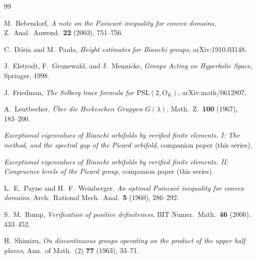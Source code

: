 \documentclass[11pt]{amsart}
\begin{document}
\begin{thebibliography}{99}

M.~Bebendorf,
\emph{A note on the Poincar\'e inequality for convex domains},
Z.\ Anal.\ Anwend.\ \textbf{22} (2003), 751--756.

C.~D\'oria and M.~Paula,
\emph{Height estimates for Bianchi groups},
arXiv:1910.03148.

J.~Elstrodt, F.~Grunewald, and J.~Mennicke,
\emph{Groups Acting on Hyperbolic Space},
Springer, 1998.

J.~Friedman,
\emph{The Selberg trace formula for $\mathrm{PSL}(2,O_K)$},
arXiv:math/0612807.

A.~Leutbecher,
\emph{\"Uber die Heckeschen Gruppen $G(\lambda)$},
Math.\ Z.\ \textbf{100} (1967), 183--200.

\emph{Exceptional eigenvalues of Bianchi orbifolds by verified finite
elements.  I: The method, and the spectral gap of the Picard orbifold},
companion paper (this series).

\emph{Exceptional eigenvalues of Bianchi orbifolds by verified finite
elements.  II: Congruence levels of the Picard group},
companion paper (this series).

L.~E.~Payne and H.~F.~Weinberger,
\emph{An optimal Poincar\'e inequality for convex domains},
Arch.\ Rational Mech.\ Anal.\ \textbf{5} (1960), 286--292.

S.~M.~Rump,
\emph{Verification of positive definiteness},
BIT Numer.\ Math.\ \textbf{46} (2006), 433--452.

H.~Shimizu,
\emph{On discontinuous groups operating on the product of the upper
half planes},
Ann.\ of Math.\ (2) \textbf{77} (1963), 33--71.

\end{thebibliography}
\end{document}

